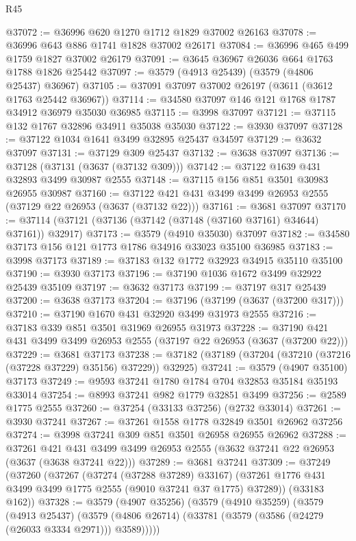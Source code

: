 \begin{lexlean}{R45}
\begin{coremodule}
@37072 := @36996 @620 @1270 @1712 @1829 @37002 @26163
@37078 := @36996 @643 @886 @1741 @1828 @37002 @26171
@37084 := @36996 @465 @499 @1759 @1827 @37002 @26179
@37091 := @3645 @36967 @26036 @664 @1763 @1788 @1826 @25442
@37097 := @3579 (@4913 @25439) (@3579 (@4806 @25437) @36967)
@37105 := @37091 @37097 @37002 @26197 (@3611 (@3612 @1763 @25442 @36967))
@37114 := @34580 @37097 @146 @121 @1768 @1787 @34912 @36979 @35030 @36985
@37115 := @3998 @37097
@37121 := @37115 @132 @1767 @32896 @34911 @35038 @35030
@37122 := @3930 @37097
@37128 := @37122 @1034 @1641 @3499 @32895 @25437 @34597
@37129 := @3632 @37097
@37131 := @37129 @309 @25437
@37132 := @3638 @37097
@37136 := @37128 (@37131 (@3637 (@37132 @309)))
@37142 := @37122 @1639 @431 @32893 @3499 @30987 @2555
@37148 := @37115 @156 @851 @3501 @30983 @26955 @30987
@37160 := @37122 @421 @431 @3499 @3499 @26953 @2555 (@37129 @22 @26953 (@3637 (@37132 @22)))
@37161 := @3681 @37097
@37170 := @37114 (@37121 (@37136 (@37142 (@37148 (@37160 @37161) @34644) @37161)) @32917)
@37173 := @3579 (@4910 @35030) @37097
@37182 := @34580 @37173 @156 @121 @1773 @1786 @34916 @33023 @35100 @36985
@37183 := @3998 @37173
@37189 := @37183 @132 @1772 @32923 @34915 @35110 @35100
@37190 := @3930 @37173
@37196 := @37190 @1036 @1672 @3499 @32922 @25439 @35109
@37197 := @3632 @37173
@37199 := @37197 @317 @25439
@37200 := @3638 @37173
@37204 := @37196 (@37199 (@3637 (@37200 @317)))
@37210 := @37190 @1670 @431 @32920 @3499 @31973 @2555
@37216 := @37183 @339 @851 @3501 @31969 @26955 @31973
@37228 := @37190 @421 @431 @3499 @3499 @26953 @2555 (@37197 @22 @26953 (@3637 (@37200 @22)))
@37229 := @3681 @37173
@37238 := @37182 (@37189 (@37204 (@37210 (@37216 (@37228 @37229) @35156) @37229)) @32925)
@37241 := @3579 (@4907 @35100) @37173
@37249 := @9593 @37241 @1780 @1784 @704 @32853 @35184 @35193 @33014
@37254 := @8993 @37241 @982 @1779 @32851 @3499
@37256 := @2589 @1775 @2555
@37260 := @37254 (@33133 @37256) (@2732 @33014)
@37261 := @3930 @37241
@37267 := @37261 @1558 @1778 @32849 @3501 @26962 @37256
@37274 := @3998 @37241 @309 @851 @3501 @26958 @26955 @26962
@37288 := @37261
    @421
    @431
    @3499
    @3499
    @26953
    @2555
    (@3632 @37241 @22 @26953 (@3637 (@3638 @37241 @22)))
@37289 := @3681 @37241
@37309 := @37249
    (@37260
      (@37267
        (@37274 (@37288 @37289) @33167)
        (@37261 @1776 @431 @3499 @3499 @1775 @2555 (@9010 @37241 @37 @1775) @37289))
      (@33183 @162))
@37328 := @3579
    (@4907 @35256)
    (@3579
      (@4910 @35259)
      (@3579
        (@4913 @25437)
        (@3579 (@4806 @26714) (@33781 (@3579 (@3586 (@24279 (@26033 @3334 @2971))) @3589)))))

\end{coremodule}
\end{lexlean}
